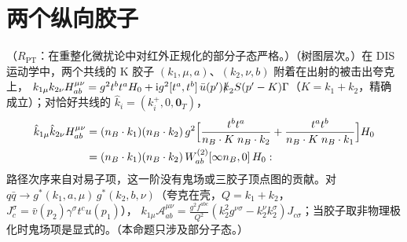 \section{两个纵向胶子}\label{sec:appF-two}

\begin{proposition}\label{prop:appF-two-gluon}
（$R_{\mathrm{PT}}$：在重整化微扰论中对红外正规化的部分子态严格。）（树图层次。）在 DIS 运动学中，两个共线的 K 胶子 $(k_1,\mu,a)$、$(k_2,\nu,b)$ 附着在出射的被击出夸克上，
$k_{1\mu}k_{2\nu}H^{\mu\nu}_{ab}=g^2t^bt^aH_0+\mathrm{i} g^2[t^a,t^b]\,\bar u(p')\slashed{k}_2S(p'-K)\Gamma$（$K=k_1+k_2$，精确成立）；对恰好共线的 $\hat k_i=(k_i^+,0,\mathbf 0_T)$，
\begin{equation}\label{eq:appF-two}
\begin{aligned}
\hat k_{1\mu}\hat k_{2\nu}H^{\mu\nu}_{ab}&=(n_B\cdot k_1)(n_B\cdot k_2)\,g^2\Bigl[\frac{t^bt^a}{n_B\cdot K\;n_B\cdot k_2}+\frac{t^at^b}{n_B\cdot K\;n_B\cdot k_1}\Bigr]H_0\\
&=(n_B\cdot k_1)(n_B\cdot k_2)\,W^{(2)}_{ab}[\infty n_B,0]\,H_0 :
\end{aligned}
\end{equation}
路径次序来自对易子项，这一阶没有鬼场或三胶子顶点图的贡献。对 $q\bar q\to g^*(k_1,a,\mu)\,g^*(k_2,b,\nu)$（夸克在壳，$Q=k_1+k_2$，$J_c^\sigma=\bar v(p_2)\gamma^\sigma t^cu(p_1)$），
$k_{1\mu}\mathcal A^{\mu\nu}_{ab}=\frac{g^2f^{abc}}{Q^2}(k_2^2g^{\nu\sigma}-k_2^\nu k_2^\sigma)J_{c\sigma}$；当胶子取非物理极化时鬼场项是显式的。（本命题只涉及部分子态。）
\end{proposition}

